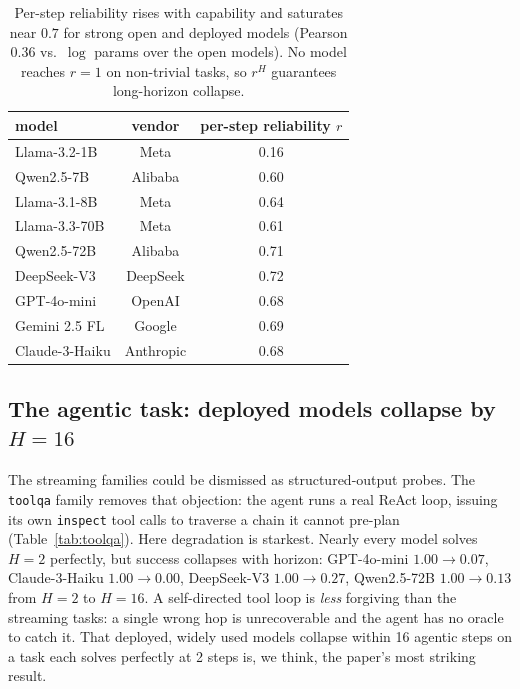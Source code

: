 \documentclass[11pt]{article}
\newcommand{\rstep}{r}
\newcommand{\horizon}{H}
\begin{document}
\begin{table}[t]
\centering\small
\begin{tabular}{lcc}
\toprule
model & vendor & per-step reliability $\rstep$ \\
\midrule
Llama-3.2-1B   & Meta      & 0.16 \\
Qwen2.5-7B     & Alibaba   & 0.60 \\
Llama-3.1-8B   & Meta      & 0.64 \\
Llama-3.3-70B  & Meta      & 0.61 \\
Qwen2.5-72B    & Alibaba   & 0.71 \\
DeepSeek-V3    & DeepSeek  & 0.72 \\
GPT-4o-mini    & OpenAI    & 0.68 \\
Gemini 2.5 FL  & Google    & 0.69 \\
Claude-3-Haiku & Anthropic & 0.68 \\
\bottomrule
\end{tabular}
\caption{Per-step reliability rises with capability and saturates near $0.7$ for strong
open and deployed models (Pearson $0.36$ vs.\ $\log$ params over the open models). No
model reaches $\rstep{=}1$ on non-trivial tasks, so $\rstep^{\horizon}$ guarantees
long-horizon collapse.}
\label{tab:rstep}
\end{table}

\subsection{The agentic task: deployed models collapse by $H{=}16$}\label{sec:agentic}
The streaming families could be dismissed as structured-output probes. The
\texttt{toolqa} family removes that objection: the agent runs a real ReAct loop,
issuing its own \texttt{inspect} tool calls to traverse a chain it cannot pre-plan
(Table~\ref{tab:toolqa}). Here degradation is starkest. Nearly every model solves
$H{=}2$ perfectly, but success collapses with horizon: GPT-4o-mini $1.00\to0.07$,
Claude-3-Haiku $1.00\to0.00$, DeepSeek-V3 $1.00\to0.27$, Qwen2.5-72B $1.00\to0.13$ from
$H{=}2$ to $H{=}16$. A self-directed tool loop is \emph{less} forgiving than the
streaming tasks: a single wrong hop is unrecoverable and the agent has no oracle to
catch it. That deployed, widely used models collapse within 16 agentic steps on a task
each solves perfectly at 2 steps is, we think, the paper's most striking result.
\end{document}
